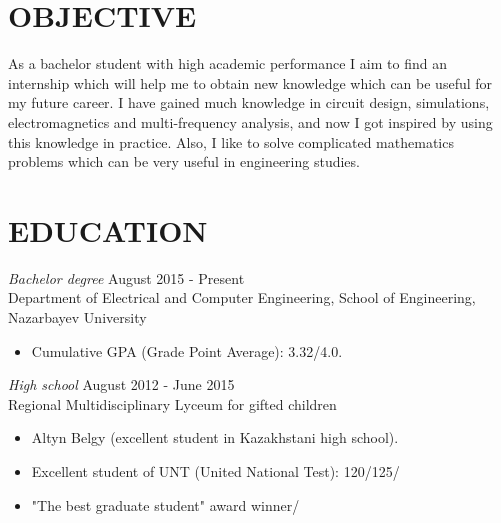 \documentclass[margin, 10pt]{res} %
\begin{document}
\begin{resume}

 
\section{OBJECTIVE}  

As a bachelor student with high academic performance I aim to find an internship which will help me to obtain new knowledge which can be useful for my future career. I have gained much knowledge in circuit design, simulations, electromagnetics and multi-frequency analysis, and now I got inspired by using this knowledge in practice. Also, I like to solve complicated mathematics problems which can be very useful in engineering studies.


\section{EDUCATION}

{\sl Bachelor degree} \hfill August 2015 - Present \\
Department of Electrical and Computer Engineering, School of Engineering, Nazarbayev University
\begin{itemize}
\item Cumulative GPA (Grade Point Average): 3.32/4.0.
\end{itemize} 

{\sl High school} \hfill August 2012 - June 2015 \\
Regional Multidisciplinary Lyceum for gifted children
\begin{itemize}
\item Altyn Belgy (excellent student in Kazakhstani high school).
\item Excellent student of UNT (United National Test): 120/125/
\item "The best graduate student" award winner/
\end{itemize} 

 

\end{resume}
\end{document}
